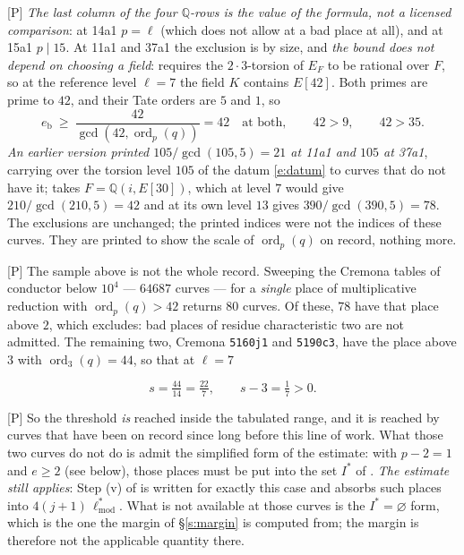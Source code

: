 \documentclass[11pt]{article}
\theoremstyle{plain}
\theoremstyle{definition}
\newcommand{\ord}{\operatorname{ord}}
\begin{document}
\textup{[P]} \emph{The last column of the four $\mathbb{Q}$-rows is the value of the
formula, not a licensed comparison}: at 14a1 $p=\ell$
(which \cite[Def.~3.1(c)]{IUT1} does not allow at a bad place at all), and at 15a1
$p\mid15$.  At 11a1 and 37a1 the exclusion is by size, and \emph{the bound does not
depend on choosing a field}: \cite[Def.~3.1(b)]{IUT1} requires the $2\cdot3$-torsion
of $E_F$ to be rational over $F$, so at the reference level $\ell=7$ the field $K$
contains $E[42]$.  Both primes are prime to $42$, and their Tate orders are $5$ and
$1$, so
\[
 e_{\mathrm b}\ \ge\ \frac{42}{\gcd(42,\ord_p(q))}=42
 \quad\text{at both},\qquad 42>9,\qquad 42>35 .
\]
\emph{An earlier version printed $105/\gcd(105,5)=21$ at 11a1 and $105$ at 37a1},
carrying over the torsion level $105$ of the datum \eqref{e:datum} to curves that do
not have it; \cite{DH25} takes $F=\mathbb{Q}(i,E[30])$, which at level $7$ would give
$210/\gcd(210,5)=42$ and at its own level $13$ gives $390/\gcd(390,5)=78$.  The
exclusions are unchanged; the printed indices were not the indices of these curves.
They are printed to show the scale of $\ord_p(q)$ on record, nothing more.

\textup{[P]} The sample above is not the whole record.  Sweeping the Cremona tables
\cite{CremonaData} of conductor below $10^4$ --- $64687$ curves --- for a \emph{single} place of
multiplicative reduction with $\ord_p(q)>42$ returns $80$ curves.  Of these, $78$ have
that place above $2$, which \cite[Def.~3.1]{IUT1} excludes: bad places of residue
characteristic two are not admitted.  The remaining two, Cremona \texttt{5160j1} and
\texttt{5190c3}, have the place above $3$ with $\ord_3(q)=44$, so that at $\ell=7$

\[
  s=\tfrac{44}{14}=\tfrac{22}{7},\qquad s-3=\tfrac17>0 .
\]

\textup{[P]} So the threshold \emph{is} reached inside the tabulated range, and it is
reached by curves that have been on record since long before this line of work.  What
those two curves do not do is admit the simplified form of the estimate: with $p-2=1$
and $e\ge2$ (see below), those places must be put into the set $I^{*}$ of
\cite[Prop.~1.4(iii)]{IUT4}.  \emph{The estimate still applies}: Step (v)
of \cite[Thm.~1.10]{IUT4} is written for exactly this case and absorbs such places into
$4(j+1)\,\ell^{*}_{\mathrm{mod}}$.  What is not available at those curves is the
$I^{*}=\varnothing$ form, which is the one the margin of \S\ref{s:margin} is computed
from; the margin is therefore not the applicable quantity there.
\end{document}
